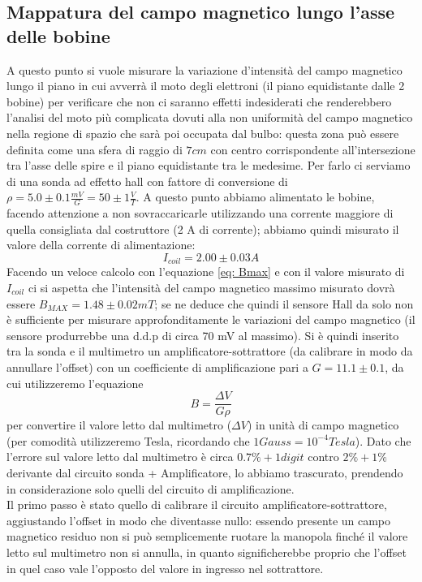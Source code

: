 \documentclass[10pt, a4paper, italian]{article}
\begin{document}
\subsection{Mappatura del campo magnetico lungo l'asse delle bobine}
\label{sec:map}
A questo punto si vuole misurare la variazione d'intensità del campo magnetico lungo il piano in cui avverrà il moto degli elettroni (il piano equidistante dalle 2 bobine) per verificare che non ci saranno effetti indesiderati che renderebbero l'analisi del moto più complicata dovuti alla non uniformità del campo magnetico nella regione di spazio che sarà poi occupata dal bulbo: questa zona può essere definita come una sfera di raggio di $7 cm$ con centro corrispondente all'intersezione tra l'asse delle spire e il piano equidistante tra le medesime.
Per farlo ci serviamo di una sonda ad effetto hall con fattore di conversione di $\rho=5.0 \pm 0.1 \frac{mV}{G} = 50 \pm 1 \frac{V}{T}$.
A questo punto abbiamo alimentato le bobine, facendo attenzione a non sovraccaricarle utilizzando una corrente maggiore di quella consigliata dal costruttore (2 A di corrente); abbiamo quindi misurato il valore della corrente di alimentazione:
\[
I_{coil}=2.00 \pm 0.03 A
\]
Facendo un veloce calcolo con l'equazione \cref{eq: Bmax} e con il valore misurato di $I_{coil}$ ci si aspetta che l'intensità del campo magnetico massimo misurato dovrà essere $B_{MAX} = 1.48 \pm 0.02 \si{mT}$; se ne deduce che quindi il sensore Hall da solo non è sufficiente per misurare approfonditamente le variazioni del campo magnetico (il sensore produrrebbe una d.d.p di circa 70 mV al massimo).
Si è quindi inserito tra la sonda e il multimetro un amplificatore-sottrattore (da calibrare in modo da annullare l'offset) con un coefficiente di amplificazione pari a $G=11.1 \pm 0.1$, da cui utilizzeremo l'equazione
\begin{equation}
B=\frac{\Delta V}{G \rho}
\end{equation}
per convertire il valore letto dal multimetro ($\Delta V$) in unità di campo magnetico (per comodità utilizzeremo Tesla, ricordando che $1 Gauss = 10^{-4} Tesla$).
Dato che l'errore sul valore letto dal multimetro è circa $0.7 \percent + 1 digit$ contro $2 \percent + 1 \percent$ derivante dal circuito sonda + Amplificatore, lo abbiamo trascurato, prendendo in considerazione solo quelli del circuito di amplificazione.\\
Il primo passo è stato quello di calibrare il circuito amplificatore-sottrattore, aggiustando l'offset in modo che diventasse nullo: essendo presente un campo magnetico residuo non si può semplicemente ruotare la manopola finché il valore letto sul multimetro non si annulla, in quanto significherebbe proprio che l'offset in quel caso vale l'opposto del valore in ingresso nel sottrattore.
\end{document}
